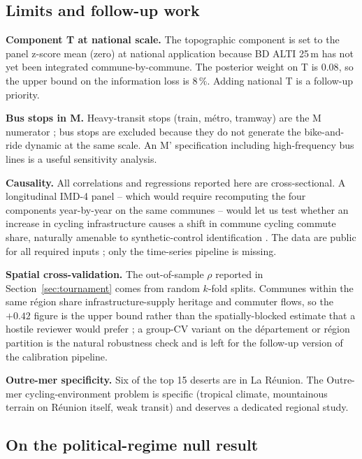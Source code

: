 \documentclass[11pt,a4paper]{article}
\begin{document}
\subsection{Limits and follow-up work}

\textbf{Component T at national scale.}  The topographic component
is set to the panel z-score mean (zero) at national application
because BD ALTI 25\,m has not yet been integrated commune-by-commune.
The posterior weight on T is $0.08$, so the upper bound on the
information loss is $8\,\%$.  Adding national T is a follow-up
priority.

\textbf{Bus stops in M.}  Heavy-transit stops (train, m\'etro,
tramway) are the M numerator ; bus stops are excluded because they
do not generate the bike-and-ride dynamic at the same scale.  An
M' specification including high-frequency bus lines is a useful
sensitivity analysis.

\textbf{Causality.}  All correlations and regressions reported here
are cross-sectional.  A longitudinal IMD-4 panel -- which would
require recomputing the four components year-by-year on the same
communes -- would let us test whether an increase in cycling
infrastructure causes a shift in commune cycling commute share,
naturally amenable to synthetic-control identification
\citep{Abadie2010,Abadie2021}.  The data are public for all
required inputs ; only the time-series pipeline is missing.

\textbf{Spatial cross-validation.}  The out-of-sample $\rho$
reported in Section~\ref{sec:tournament} comes from random
$k$-fold splits.  Communes within the same r\'egion share
infrastructure-supply heritage and commuter flows, so the
$+0.42$ figure is the upper bound rather than the
spatially-blocked estimate that a hostile reviewer would
prefer ; a group-CV variant \citep{Roberts2017,Pohjankukka2017}
on the d\'epartement or r\'egion partition is the natural
robustness check and is left for the follow-up version of the
calibration pipeline.

\textbf{Outre-mer specificity.}  Six of the top 15 deserts are in
La R\'eunion.  The Outre-mer cycling-environment problem is
specific (tropical climate, mountainous terrain on R\'eunion
itself, weak transit) and deserves a dedicated regional study.

\subsection{On the political-regime null result}
\end{document}
